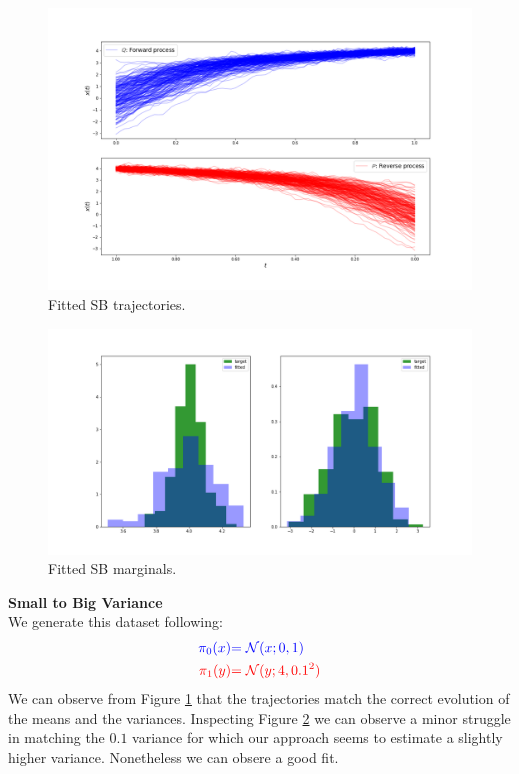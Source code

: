 \documentclass[a4paper,12pt,twoside,openright]{report}
\theoremstyle{definition}
\begin{document}
\begin{figure}
    \centering
    \includegraphics[scale=0.4,trim={4.3cm 1cm 2.5cm 0}, clip]{images/GP/gp_bigvar_trajectories.png}
    \caption{ Fitted SB trajectories.  }
    \label{fig:bigvar200trajectroies}
\end{figure}
\begin{figure}
    \centering
    \includegraphics[scale=0.3,trim={4.3cm 1cm 2.5cm 0}, clip]{images/GP/gp_bigvar_boundaires.png}
    \caption{ Fitted SB marginals.  }
    \label{fig:bigvar200boundaries}
\end{figure}
\textbf{Small to Big Variance}\\
We generate this dataset following:
\begin{align*}
\color{blue}{\pi_0(x)} &\color{blue}{= {\mathcal{N}}(x; 0,  1)} \\
    \color{red}{\pi_1(y)} &\color{red}{= {\mathcal{N}}(y; 4, 0.1^2)} 
\end{align*}
We can observe from Figure \ref{fig:bigvar200trajectroies} that the trajectories match the correct evolution of the means and the variances. Inspecting Figure \ref{fig:bigvar200boundaries} we can observe a minor struggle in matching the $0.1$ variance for which our approach seems to estimate a slightly higher variance. Nonetheless we can obsere a good fit.
\end{document}
